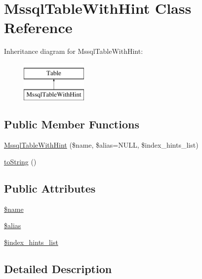 \hypertarget{classMssqlTableWithHint}{\section{Mssql\-Table\-With\-Hint Class Reference}
\label{classMssqlTableWithHint}
}
Inheritance diagram for Mssql\-Table\-With\-Hint\-:\begin{figure}[H]
\begin{center}
\leavevmode
\includegraphics[height=2.000000cm]{classMssqlTableWithHint}
\end{center}
\end{figure}
\subsection*{Public Member Functions}
\begin{DoxyCompactItemize}
\item 
\hyperlink{classMssqlTableWithHint_a7d6526d0b856c8a5afe4b630b27ddbe4}{Mssql\-Table\-With\-Hint} (\$name, \$alias=N\-U\-L\-L, \$index\-\_\-hints\-\_\-list)
\item 
\hyperlink{classMssqlTableWithHint_ac73aaae941e5dd3f4c22d7c718a317f8}{to\-String} ()
\end{DoxyCompactItemize}
\subsection*{Public Attributes}
\begin{DoxyCompactItemize}
\item 
\hyperlink{classMssqlTableWithHint_a277ff00978ac421ee07783d796318bf5}{\$name}
\item 
\hyperlink{classMssqlTableWithHint_abe5643a9f48a397be1d66f7aba2fd7d9}{\$alias}
\item 
\hyperlink{classMssqlTableWithHint_af748588ba4420eb31c412a83b1623a60}{\$index\-\_\-hints\-\_\-list}
\end{DoxyCompactItemize}


\subsection{Detailed Description}


